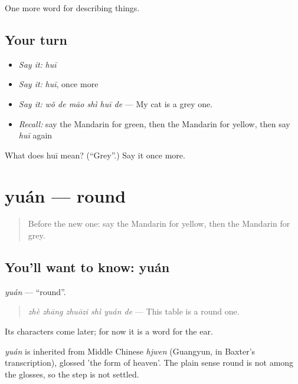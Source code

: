 \begin{grammarlens}[title={What you've built}]
One more word for describing things.
\end{grammarlens}

\subsection*{Your turn}
\begin{itemize}
\raggedright
  \item \emph{Say it:} \emph{huī}
  \item \emph{Say it:} \emph{huī}, once more
  \item \emph{Say it:} \emph{wǒ de māo shì huī de} — My cat is a grey one.
  \item \emph{Recall:} say the Mandarin for green, then the Mandarin for yellow, then say \emph{huī} again
\end{itemize}

\begin{tcolorbox}[breakable,colback=teal!4,colframe=teal!35!black,title={Before you move on}]
What does huī mean? (\textquotedblleft{}Grey\textquotedblright{}.) Say it once more.
\end{tcolorbox}
\section[yuán]{yuán — round}

\label{lesson:ZH-C139-yuan}



\begin{quote}
Before the new one: say the Mandarin for yellow, then the Mandarin for grey.
\end{quote}

\subsection*{You'll want to know: yuán}
\emph{yuán} — \textquotedblleft{}round\textquotedblright{}.

\begin{quote}
\emph{zhè zhāng zhuōzi shì yuán de} — This table is a round one.
\end{quote}

Its characters come later; for now it is a word for the ear.

\begin{cousinweb}
\emph{yuán} is inherited from Middle Chinese \emph{hjwen} (Guangyun, in Baxter's transcription), glossed 'the form of heaven'. The plain sense round is not among the glosses, so the step is not settled.
\end{cousinweb}

